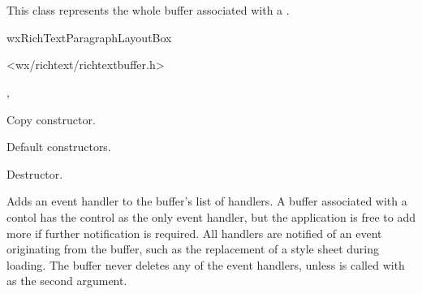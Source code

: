 \section{}\label{wxrichtextbuffer}

This class represents the whole buffer associated with a .


wxRichTextParagraphLayoutBox


<wx/richtext/richtextbuffer.h>





, 


\label{wxrichtextbufferwxrichtextbuffer}


Copy constructor.


Default constructors.

\label{wxrichtextbufferdtor}


Destructor.

\label{wxrichtextbufferaddeventhandler}


Adds an event handler to the buffer's list of handlers. A buffer associated with
a contol has the control as the only event handler, but the application is free
to add more if further notification is required. All handlers are notified
of an event originating from the buffer, such as the replacement of a style sheet
during loading. The buffer never deletes any of the event handlers, unless 
 is
called with \true as the second argument.

